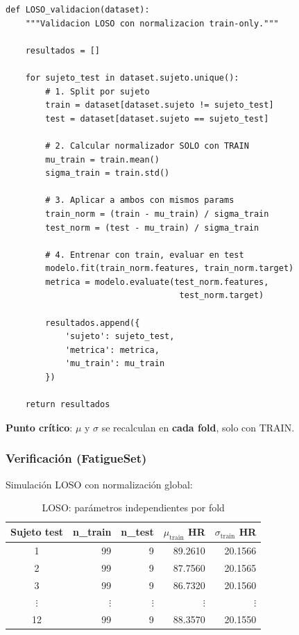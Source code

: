 \documentclass[11pt,twoside,a4paper]{article}
\begin{document}
\begin{lstlisting}[caption=LOSO correcto sin leakage]
def LOSO_validacion(dataset):
    """Validacion LOSO con normalizacion train-only."""

    resultados = []

    for sujeto_test in dataset.sujeto.unique():
        # 1. Split por sujeto
        train = dataset[dataset.sujeto != sujeto_test]
        test = dataset[dataset.sujeto == sujeto_test]

        # 2. Calcular normalizador SOLO con TRAIN
        mu_train = train.mean()
        sigma_train = train.std()

        # 3. Aplicar a ambos con mismos params
        train_norm = (train - mu_train) / sigma_train
        test_norm = (test - mu_train) / sigma_train

        # 4. Entrenar con train, evaluar en test
        modelo.fit(train_norm.features, train_norm.target)
        metrica = modelo.evaluate(test_norm.features,
                                   test_norm.target)

        resultados.append({
            'sujeto': sujeto_test,
            'metrica': metrica,
            'mu_train': mu_train
        })

    return resultados
\end{lstlisting}

\textbf{Punto crítico}: $\mu$ y $\sigma$ se recalculan en \textbf{cada fold}, solo con TRAIN.

\subsubsection{Verificación (FatigueSet)}

Simulación LOSO con normalización global:

\begin{table}[H]
\centering
\caption{LOSO: parámetros independientes por fold}
\label{tab:loso_no_leak}
\begin{tabular}{|c|r|r|r|r|}
\hline
Sujeto test & n\_train & n\_test & $\mu_{\text{train}}$ HR & $\sigma_{\text{train}}$ HR \\
\hline
1 & 99 & 9 & 89.2610 & 20.1566 \\
\hline
2 & 99 & 9 & 87.7560 & 20.1565 \\
\hline
3 & 99 & 9 & 86.7320 & 20.1560 \\
\hline
$\vdots$ & $\vdots$ & $\vdots$ & $\vdots$ & $\vdots$ \\
\hline
12 & 99 & 9 & 88.3570 & 20.1550 \\
\hline
\end{tabular}
\end{table}
\end{document}
